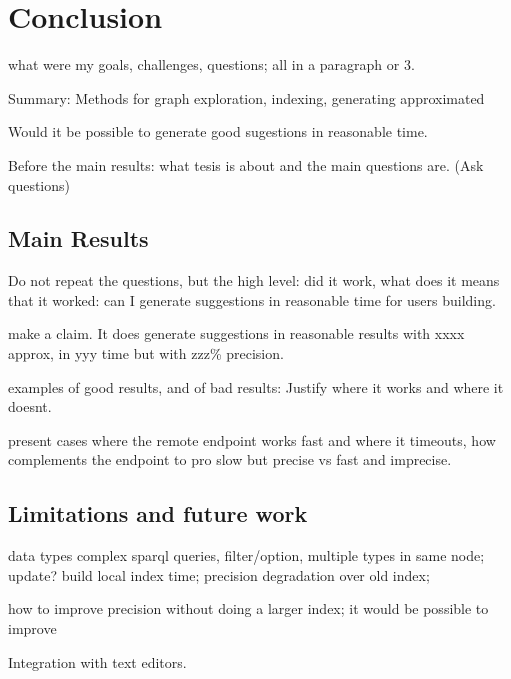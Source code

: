 \chapter{Conclusion}

what were my goals, challenges, questions;
all in a paragraph or 3.

Summary:
Methods for graph exploration, indexing, generating approximated 

Would it be possible to generate good sugestions in reasonable time.

Before the main results: what tesis is about and the main questions are.
(Ask questions)

\section{Main Results}

Do not repeat the questions, but the high level: did it work, what does it means that it worked: can I generate suggestions in reasonable time for users building.

make a claim. It does generate suggestions in reasonable
results with xxxx approx, in yyy time but with zzz\% precision.

examples of good results, and of bad results: Justify where it works and where it doesnt.

present cases where the remote endpoint works fast and where it timeouts, how complements the endpoint to pro
slow but precise vs fast and imprecise.

\section{Limitations and future work}
\label{chap:futureWork}

data types
complex sparql queries, filter/option, multiple types in same node;
update? build local index time;
precision degradation over old index;

how to improve precision without doing a larger index; it would be possible to improve 

Integration with text editors.



